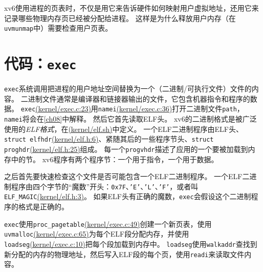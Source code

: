xv6使用进程的页表时，不仅是用它来告诉硬件如何映射用户虚拟地址，还用它来记录哪些物理内存页已经被分配给进程。
这样是为什么释放用户内存（在\texttt{uvmunmap}中）需要检查用户页表。

\section{代码：\texttt{exec}}
\texttt{exec}系统调用把进程的用户地址空间替换为一个（二进制/可执行文件）文件的内容。
二进制文件通常是编译器和链接器输出的文件，它包含机器指令和程序的数据。
\texttt{exec}\href{https://github.com/mit-pdos/xv6-riscv/blob/riscv/kernel/exec.c#L23}{(kernel/exec.c:23)}用\texttt{namei}\href{https://github.com/mit-pdos/xv6-riscv/blob/riscv/kernel/exec.c#L36}{(kernel/exec.c:36)}打开二进制文件\texttt{path}，\texttt{namei}将会在\autoref{ch08}中解释。
然后它首先读取ELF头。
xv6的二进制格式是被广泛使用的\emph{ELF格式}，在\href{https://github.com/mit-pdos/xv6-riscv/blob/riscv/kernel/elf.h}{(kernel/elf.sh)}中定义。
一个ELF二进制程序由ELF头、\texttt{struct elfhdr}\href{https://github.com/mit-pdos/xv6-riscv/blob/riscv/kernel/elf.h#L6}{(kernel/elf.h:6)}、紧随其后的一些程序节头、\texttt{struct proghdr}\href{https://github.com/mit-pdos/xv6-riscv/blob/riscv/kernel/elf.h#L25}{(kernel/elf.h:25)}组成。
每一个\texttt{progvhdr}描述了应用的一个要被加载到内存中的节。
xv6程序有两个程序节：一个用于指令，一个用于数据。

之后首先要快速检查这个文件是否可能包含一个ELF二进制程序。
一个ELF二进制程序由四个字节的“魔数”开头：\texttt{0x7F}、\texttt{'E'}、\texttt{'L'}、\texttt{'F'}，或者叫\texttt{ELF\_MAGIC}\href{https://github.com/mit-pdos/xv6-riscv/blob/riscv/kernel/elf.h#L3}{(kernel/elf.h:3)}。
如果ELF头有正确的魔数，\texttt{exec}会假设这个二进制程序的格式是正确的。

\texttt{exec}使用\texttt{proc\_pagetable}\href{https://github.com/mit-pdos/xv6-riscv/blob/riscv/kernel/exec.c#L49}{(kernel/exec.c:49)}创建一个新页表，使用\texttt{uvmalloc}\href{https://github.com/mit-pdos/xv6-riscv/blob/riscv/kernel/exec.c#L65}{(kernel/exec.c:65)}为每个ELF段分配内存，并使用\texttt{loadseg}\href{https://github.com/mit-pdos/xv6-riscv/blob/riscv/kernel/exec.c#L10}{(kernel/exec.c:10)}把每个段加载到内存中。
\texttt{loadseg}使用\texttt{walkaddr}查找到新分配的内存的物理地址，然后写入ELF段的每个页，使用\texttt{readi}来读取文件内容。

